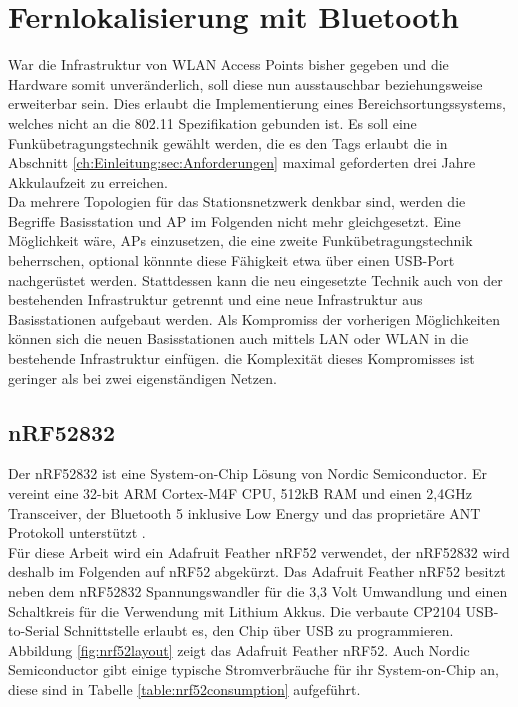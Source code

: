\chapter{Fernlokalisierung mit Bluetooth}
\label{ch:phase3}
War die Infrastruktur von WLAN Access Points bisher gegeben und die Hardware somit unveränderlich, soll diese nun ausstauschbar beziehungsweise erweiterbar sein.
Dies erlaubt die Implementierung eines Bereichsortungssystems, welches nicht an die 802.11 Spezifikation gebunden ist.
Es soll eine Funkübetragungstechnik gewählt werden, die es den Tags erlaubt die in Abschnitt \ref{ch:Einleitung:sec:Anforderungen} maximal geforderten drei Jahre Akkulaufzeit zu erreichen.\\
Da mehrere Topologien für das Stationsnetzwerk denkbar sind, werden die Begriffe Basisstation und AP im Folgenden nicht mehr gleichgesetzt.
Eine Möglichkeit wäre, APs einzusetzen, die eine zweite Funkübetragungstechnik beherrschen, optional könnnte diese Fähigkeit etwa über einen USB-Port nachgerüstet werden.
Stattdessen kann die neu eingesetzte Technik auch von der bestehenden Infrastruktur getrennt und eine neue Infrastruktur aus Basisstationen aufgebaut werden.
Als Kompromiss der vorherigen Möglichkeiten können sich die neuen Basisstationen auch mittels LAN oder WLAN in die bestehende Infrastruktur einfügen. 
die Komplexität dieses Kompromisses ist geringer als bei zwei eigenständigen Netzen.

\section{nRF52832}
Der nRF52832 ist eine System-on-Chip Lösung von Nordic Semiconductor.
Er vereint eine 32-bit ARM Cortex-M4F CPU, 512kB RAM und einen 2,4GHz Transceiver, der Bluetooth 5 inklusive Low Energy und das proprietäre ANT Protokoll unterstützt \cite{nordic2017nrf}.\\
Für diese Arbeit wird ein Adafruit Feather nRF52 verwendet, der nRF52832 wird deshalb im Folgenden auf nRF52 abgekürzt.
Das Adafruit Feather nRF52 besitzt neben dem nRF52832 Spannungswandler für die 3,3 Volt Umwandlung und einen Schaltkreis für die Verwendung mit Lithium Akkus. Die verbaute CP2104 USB-to-Serial Schnittstelle erlaubt es, den Chip über USB zu programmieren.\\
Abbildung \ref{fig:nrf52layout} zeigt das Adafruit Feather nRF52.
Auch Nordic Semiconductor gibt einige typische Stromverbräuche für ihr System-on-Chip an, diese sind in Tabelle \ref{table:nrf52consumption} aufgeführt.

